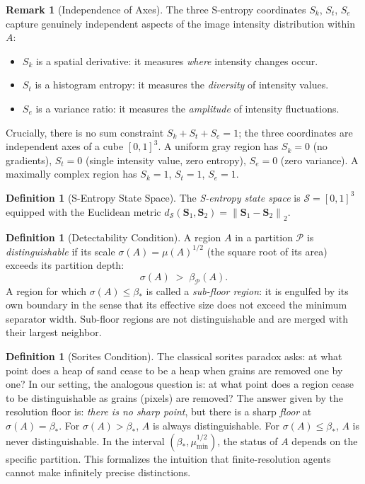 \documentclass[twocolumn]{article}
\theoremstyle{plain}
\theoremstyle{definition}
\newtheorem{definition}[theorem]{Definition}
\newtheorem{remark}[theorem]{Remark}
\newcommand{\PP}{\mathcal{P}}
\newcommand{\SS}{\mathcal{S}}
\newcommand{\Sk}{S_k}
\newcommand{\St}{S_t}
\newcommand{\Se}{S_e}
\newcommand{\bS}{\mathbf{S}}
\newcommand{\dS}{d_{\mathcal{S}}}
\newcommand{\partdep}{\beta_{\PP}}
\newcommand{\bstar}{\beta_*}
\newcommand{\mumin}{\mu_{\min}}
\newcommand{\norm}[1]{\left\lVert #1 \right\rVert}
\begin{document}
\begin{remark}[Independence of Axes]
The three S-entropy coordinates $\Sk$, $\St$, $\Se$ capture genuinely independent
aspects of the image intensity distribution within $A$:
\begin{itemize}
\item $\Sk$ is a spatial derivative: it measures \emph{where} intensity changes occur.
\item $\St$ is a histogram entropy: it measures the \emph{diversity} of intensity values.
\item $\Se$ is a variance ratio: it measures the \emph{amplitude} of intensity fluctuations.
\end{itemize}
Crucially, there is no sum constraint $\Sk + \St + \Se = 1$; the three coordinates
are independent axes of a cube $[0,1]^3$. A uniform gray region has
$\Sk = 0$ (no gradients), $\St = 0$ (single intensity value, zero entropy), $\Se = 0$
(zero variance). A maximally complex region has $\Sk = 1$, $\St = 1$, $\Se = 1$.
\end{remark}

\begin{definition}[S-Entropy State Space]
\label{def:statespace}
The \emph{S-entropy state space} is $\SS = [0,1]^3$ equipped with the Euclidean
metric $\dS(\bS_1, \bS_2) = \norm{\bS_1 - \bS_2}_2$.
\end{definition}

\begin{definition}[Detectability Condition]
\label{def:detect}
A region $A$ in a partition $\PP$ is \emph{distinguishable} if its scale
$\sigma(A) = \mu(A)^{1/2}$ (the square root of its area) exceeds its partition
depth:
\[
  \sigma(A) \;>\; \partdep(A).
\]
A region for which $\sigma(A) \leq \bstar$ is called a \emph{sub-floor region}:
it is engulfed by its own boundary in the sense that its effective size does not
exceed the minimum separator width. Sub-floor regions are not distinguishable and
are merged with their largest neighbor.
\end{definition}

\begin{definition}[Sorites Condition]
\label{def:sorites}
The classical sorites paradox asks: at what point does a heap of sand cease to
be a heap when grains are removed one by one? In our setting, the analogous
question is: at what point does a region cease to be distinguishable as grains
(pixels) are removed? The answer given by the resolution floor is:
\emph{there is no sharp point}, but there is a sharp \emph{floor} at $\sigma(A)
= \bstar$. For $\sigma(A) > \bstar$, $A$ is always distinguishable. For
$\sigma(A) \leq \bstar$, $A$ is never distinguishable. In the interval
$(\bstar, \mumin^{1/2})$, the status of $A$ depends on the specific partition.
This formalizes the intuition that finite-resolution agents cannot make
infinitely precise distinctions.
\end{definition}
\end{document}
